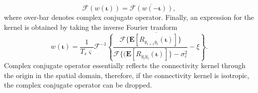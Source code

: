 \documentclass[]{article}
\begin{document}
\begin{equation}
 \mathcal{F}\left(w(\boldsymbol\iota)\right)=\overline{\mathcal{F}\left(w(-\boldsymbol\iota)\right)},
\end{equation}
where over-bar denotes complex conjugate operator. Finally, an expression for the kernel is obtained by taking the inverse Fourier tranform 
\begin{equation}\label{eq:KernelSolution}
	w(\boldsymbol\iota) = \frac{1}{T_s\varsigma }\mathcal{F}^{-1}\overline{\left\{\frac{\mathcal{F}\{\mathbf{E}[R_{y_{t+1}y_t}(\boldsymbol{\iota})]\}}{\mathcal{F}\{(\mathbf{E}\left[R_{y_ty_t}(\boldsymbol\iota)\right]\} - \sigma_{\varepsilon}^2 }-\xi\right\}}.
\end{equation}
Complex conjugate operator essentially reflects the connectivity kernel through the origin in the spatial domain, therefore, if the connectivity kernel is isotropic, the complex conjugate operator can be dropped. 
\end{document}
